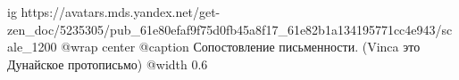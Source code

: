  
 
 
 
 

\ifcmt
  ig https://avatars.mds.yandex.net/get-zen_doc/5235305/pub_61e80efaf9f75d0fb45a8f17_61e82b1a134195771cc4e943/scale_1200
	@wrap center
	@caption Сопостовление письменности. (Vinca это Дунайское протописьмо)
	@width 0.6
\fi

